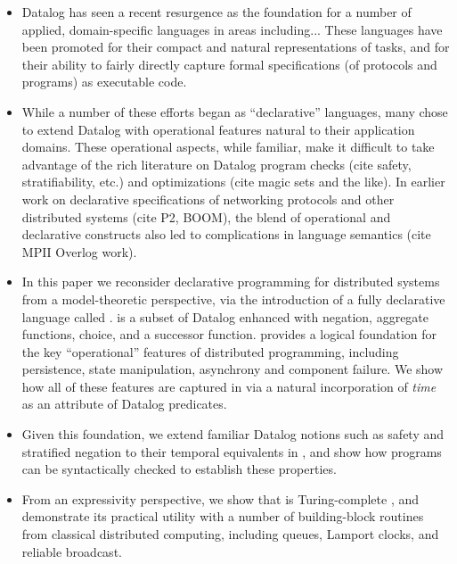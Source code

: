 \begin{itemize}
	\item Datalog has seen a recent resurgence as the foundation for a number of applied, domain-specific languages in areas including...  These languages have been promoted for their compact and natural representations of tasks, and for their ability to fairly directly capture formal specifications (of protocols and programs) as executable code.
	\item While a number of these efforts began as ``declarative'' languages, many chose to extend Datalog with operational features natural to their application domains.  These operational aspects, while familiar, make it difficult to take advantage of the rich literature on Datalog program checks (cite safety, stratifiability, etc.) and optimizations (cite magic sets and the like).  In earlier work on declarative specifications of networking protocols and other distributed systems (cite P2, BOOM), the blend of operational and declarative constructs also led to complications in language semantics (cite MPII Overlog work).
	\item In this paper we reconsider declarative programming for distributed systems from a model-theoretic perspective, via the introduction of a fully declarative language called \lang.   \lang is a subset of Datalog enhanced with negation, aggregate functions, choice, and a successor function.  \lang provides a logical foundation for the key ``operational'' features of distributed programming, including persistence, state manipulation, asynchrony and component failure.  We show how all of these features are captured in \lang via a natural incorporation of {\em time} as an attribute of Datalog predicates.
	\item Given this foundation, we extend familiar Datalog notions such as safety and stratified negation to their temporal equivalents in \lang, and show how \lang programs can be syntactically checked to establish these properties.
	\item From an expressivity perspective, we show that \lang is Turing-complete , and demonstrate its practical utility with a number of building-block routines from classical distributed computing, including queues, Lamport clocks, and reliable broadcast.
\end{itemize}

